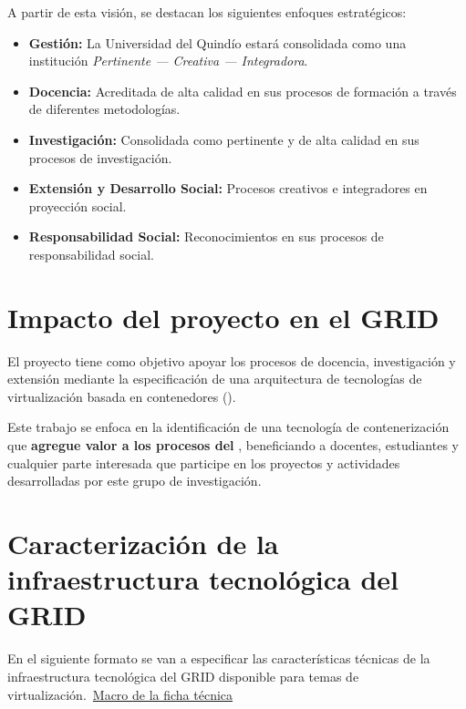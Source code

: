A partir de esta visión, se destacan los siguientes enfoques estratégicos:

\begin{itemize}
    \item \textbf{Gestión:} La Universidad del Quindío estará consolidada como una institución \textit{Pertinente --- Creativa --- Integradora}.

    \item \textbf{Docencia:} Acreditada de alta calidad en sus procesos de formación a través de diferentes metodologías.

    \item \textbf{Investigación:} Consolidada como pertinente y de alta calidad en sus procesos de investigación.

    \item \textbf{Extensión y Desarrollo Social:} Procesos creativos e integradores en proyección social.

    \item \textbf{Responsabilidad Social:} Reconocimientos en sus procesos de responsabilidad social.
\end{itemize}

\section{Impacto del proyecto en el GRID}

El proyecto tiene como objetivo apoyar los procesos de docencia, investigación
y extensión mediante la especificación de una arquitectura de tecnologías de 
virtualización basada en contenedores (\VBC). 

Este trabajo se enfoca en la identificación de una tecnología de contenerización que 
\textbf{agregue valor a los procesos del \GRID}, beneficiando a docentes, estudiantes
y cualquier parte interesada que participe en los proyectos y actividades desarrolladas 
por este grupo de investigación.

\section{Caracterización de la infraestructura tecnológica del GRID}
En el siguiente formato se van a especificar las características técnicas de la infraestructura tecnológica del GRID disponible para temas de virtualización.\ \href{https://docs.google.com/spreadsheets/d/14NBv72ucVTrLqGIldYdIsjdBGt3QlgwcblcVRis-DaQ/edit?usp=sharing}{Macro de la ficha técnica}


